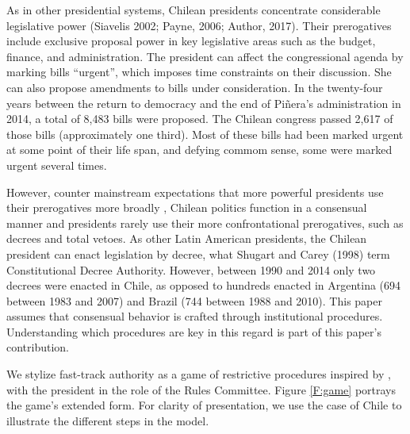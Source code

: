 \documentclass[letter,12pt]{article}
\begin{document}
As in other presidential systems, Chilean presidents concentrate considerable legislative power (Siavelis 2002; Payne, 2006; Author, 2017). Their prerogatives include exclusive proposal power in key legislative areas such as the budget, finance, and administration. The president can affect the congressional agenda by marking bills “urgent”, which imposes time constraints on their discussion. She can also propose amendments to bills under consideration. In the twenty-four years between the return to democracy and the end of Piñera’s administration in 2014, a total of 8,483 bills were proposed. The Chilean congress passed 2,617 of those bills (approximately one third). Most of these bills had been marked urgent at some point of their life span, and defying commom sense, some were marked urgent several times. 

However, counter mainstream expectations that more powerful presidents use their prerogatives more broadly \citep{odonnell.1993,odonnell.1994}, Chilean politics function in a consensual manner and presidents rarely use their more confrontational prerogatives, such as decrees and total vetoes. As other Latin American presidents, the Chilean president can enact legislation by decree, what Shugart and Carey (1998) term Constitutional Decree Authority. However, between 1990 and 2014 only two decrees were enacted in Chile, as opposed to hundreds enacted in Argentina (694 between 1983 and 2007) and Brazil (744 between 1988 and 2010). This paper assumes that consensual behavior is crafted through institutional procedures. Understanding which procedures are key in this regard is part of this paper's contribution. %

We stylize fast-track authority as a game of restrictive procedures inspired by \citet{dion.huber.1996}, with the president in the role of the Rules Committee. Figure \ref{F:game} portrays the game's extended form. For clarity of presentation, we use the case of Chile to illustrate the different steps in the model. 
\end{document}
